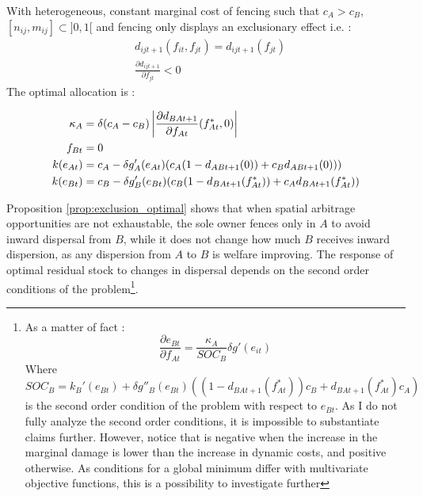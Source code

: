 \begin{proposition}
\label{prop:exclusion_optimal}
With heterogeneous, constant marginal cost of fencing such that $c_A>c_B$, $[n_{ij},m_{ij}] \subset ]0,1[$ and fencing only displays an exclusionary effect i.e. : 
\begin{align*}
& d_{ijt+1}(f_{it},f_{jt}) = d_{ijt+1}(f_{jt})\\
& \frac{\partial d_{ijt+1}}{\partial f_{jt}}<0
\end{align*}
The optimal allocation is : 

\begin{align}
\kappa_A &= \delta(c_A - c_B)\left|\frac{\partial d_{BAt+1}}{\partial f_{At}}(f_{At}^*, 0) \right|\\
f_{Bt}& = 0\\
k(e_{At}) &= c_A - \delta g_A'(e_{At})\large(c_A (1-d_{ABt+1}(0)) + c_B d_{ABt+1}(0))\large)\\
%
k(e_{Bt}) &= c_B - \delta g_B'(e_{Bt})\large(c_B (1-d_{BAt+1}(f_{At}^*)) + c_A d_{BAt+1}(f_{At}^*)\large)
\end{align}
\end{proposition}
Proposition \ref{prop:exclusion_optimal} shows that when spatial arbitrage opportunities are not exhaustable, the sole owner fences only in $A$ to avoid inward dispersal from $B$, while it does not change how much $B$ receives inward dispersion, as any dispersion from $A$ to $B$ is welfare improving. The response of optimal residual stock to changes in dispersal depends on the second order conditions of the problem\footnote{As a matter of fact : 
\begin{equation}
\frac{\partial e_{Bt}}{\partial f_{At}} = \frac{\kappa_A}{SOC_B}\delta g'(e_{it})
\end{equation}
Where $SOC_B = k_B'(e_{Bt}) + \delta g''_B(e_{Bt})((1 - d_{BAt+1}(f_{At}^*))c_{B} + d_{BAt+1}(f_{At}^*)c_A)$ is the second order condition of the problem with respect to $e_{Bt}$. As I do not fully analyze the second order conditions, it is impossible to substantiate claims further. However, notice that is negative when the increase in the marginal damage is lower than the increase in dynamic costs, and positive otherwise. As conditions for a global minimum differ with multivariate objective functions, this is a possibility to investigate further}.

